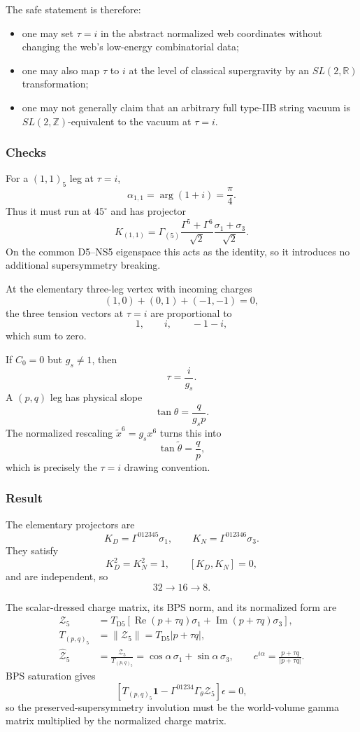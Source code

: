 \documentclass[
  10pt,
  a4paper,
  openany]{book}
\providecommand{\tightlist}{%
  \setlength{\itemsep}{0pt}\setlength{\parskip}{0pt}}
\begin{document}
The safe statement is therefore:

\begin{itemize}
\tightlist
\item
  one may set \(\tau=i\) in the abstract normalized web coordinates
  without changing the web's low-energy combinatorial data;
\item
  one may also map \(\tau\) to \(i\) at the level of classical
  supergravity by an \(SL(2,\mathbb R)\) transformation;
\item
  one may not generally claim that an arbitrary full type-IIB string
  vacuum is \(SL(2,\mathbb Z)\)-equivalent to the vacuum at \(\tau=i\).
\end{itemize}

\subsubsection{Checks}\label{checks-32}

For a \((1,1)_5\) leg at \(\tau=i\), \[
\alpha_{1,1}=\arg(1+i)=\frac{\pi}{4}.
\] Thus it must run at \(45^\circ\) and has projector \[
K_{(1,1)}
=\Gamma_{(5)}
\frac{\Gamma^5+\Gamma^6}{\sqrt2}
\frac{\sigma_1+\sigma_3}{\sqrt2}.
\] On the common D5--NS5 eigenspace this acts as the identity, so it
introduces no additional supersymmetry breaking.

At the elementary three-leg vertex with incoming charges \[
(1,0)+(0,1)+(-1,-1)=0,
\] the three tension vectors at \(\tau=i\) are proportional to \[
1,\qquad i,\qquad-1-i,
\] which sum to zero.

If \(C_0=0\) but \(g_s\neq1\), then \[
\tau=\frac{i}{g_s}.
\] A \((p,q)\) leg has physical slope \[
\tan\theta=\frac{q}{g_sp}.
\] The normalized rescaling \(\tilde x^6=g_sx^6\) turns this into \[
\tan\tilde\theta=\frac{q}{p},
\] which is precisely the \(\tau=i\) drawing convention.

\subsubsection{Result}\label{result-38}

The elementary projectors are \[
\boxed{
K_D=\Gamma^{012345}\sigma_1,
\qquad
K_N=\Gamma^{012346}\sigma_3
}.
\] They satisfy \[
K_D^2=K_N^2=1,
\qquad
[K_D,K_N]=0,
\] and are independent, so \[
\boxed{32\longrightarrow16\longrightarrow8}.
\]

The scalar-dressed charge matrix, its BPS norm, and its normalized form
are \[
\boxed{
\begin{aligned}
\mathcal Z_5
&=T_{\mathrm{D5}}
\left[
\operatorname{Re}(p+\tau q)\sigma_1
+\operatorname{Im}(p+\tau q)\sigma_3
\right],\\
T_{(p,q)_5}
&=\|\mathcal Z_5\|
=T_{\mathrm{D5}}|p+\tau q|,\\
\widehat{\mathcal Z}_5
&=\frac{\mathcal Z_5}{T_{(p,q)_5}}
=\cos\alpha\,\sigma_1+\sin\alpha\,\sigma_3,
\qquad
e^{i\alpha}=\frac{p+\tau q}{|p+\tau q|}.
\end{aligned}
}
\] BPS saturation gives \[
\left[
T_{(p,q)_5}\mathbf1
-\Gamma^{01234}\Gamma_\theta\mathcal Z_5
\right]\epsilon=0,
\] so the preserved-supersymmetry involution must be the world-volume
gamma matrix multiplied by the normalized charge matrix.
\end{document}
